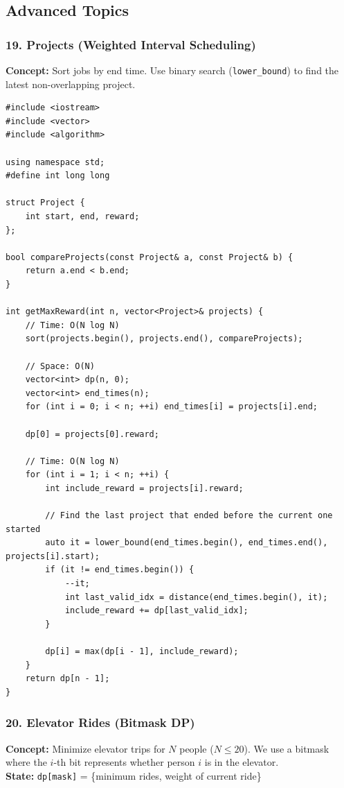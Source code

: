 \subsection{Advanced Topics}

\subsubsection{19. Projects (Weighted Interval Scheduling)}
\textbf{Concept:} Sort jobs by end time. Use binary search (\texttt{lower\_bound}) to find the latest non-overlapping project.

\begin{lstlisting}
#include <iostream>
#include <vector>
#include <algorithm>

using namespace std;
#define int long long

struct Project {
    int start, end, reward;
};

bool compareProjects(const Project& a, const Project& b) {
    return a.end < b.end;
}

int getMaxReward(int n, vector<Project>& projects) {
    // Time: O(N log N)
    sort(projects.begin(), projects.end(), compareProjects);
    
    // Space: O(N)
    vector<int> dp(n, 0);
    vector<int> end_times(n);
    for (int i = 0; i < n; ++i) end_times[i] = projects[i].end;
    
    dp[0] = projects[0].reward;
    
    // Time: O(N log N)
    for (int i = 1; i < n; ++i) {
        int include_reward = projects[i].reward;
        
        // Find the last project that ended before the current one started
        auto it = lower_bound(end_times.begin(), end_times.end(), projects[i].start);
        if (it != end_times.begin()) {
            --it;
            int last_valid_idx = distance(end_times.begin(), it);
            include_reward += dp[last_valid_idx];
        }
        
        dp[i] = max(dp[i - 1], include_reward);
    }
    return dp[n - 1];
}
\end{lstlisting}

\subsubsection{20. Elevator Rides (Bitmask DP)}
\textbf{Concept:} Minimize elevator trips for $N$ people ($N \le 20$). We use a bitmask where the $i$-th bit represents whether person $i$ is in the elevator. \\
\textbf{State:} \texttt{dp[mask]} = \{minimum rides, weight of current ride\}

